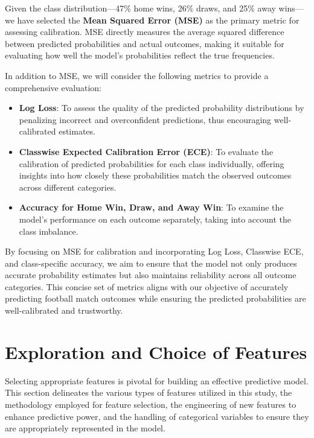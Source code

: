 Given the class distribution—47\% home wins, 26\% draws, and 25\% away wins—we have selected the \textbf{Mean Squared Error (MSE)} as the primary metric for assessing calibration. MSE directly measures the average squared difference between predicted probabilities and actual outcomes, making it suitable for evaluating how well the model's probabilities reflect the true frequencies.

In addition to MSE, we will consider the following metrics to provide a comprehensive evaluation:

\begin{itemize}
    \item \textbf{Log Loss}: To assess the quality of the predicted probability distributions by penalizing incorrect and overconfident predictions, thus encouraging well-calibrated estimates.
    \item \textbf{Classwise Expected Calibration Error (ECE)}: To evaluate the calibration of predicted probabilities for each class individually, offering insights into how closely these probabilities match the observed outcomes across different categories.
    \item \textbf{Accuracy for Home Win, Draw, and Away Win}: To examine the model's performance on each outcome separately, taking into account the class imbalance.
\end{itemize}

By focusing on MSE for calibration and incorporating Log Loss, Classwise ECE, and class-specific accuracy, we aim to ensure that the model not only produces accurate probability estimates but also maintains reliability across all outcome categories. This concise set of metrics aligns with our objective of accurately predicting football match outcomes while ensuring the predicted probabilities are well-calibrated and trustworthy.

\section{Exploration and Choice of Features}
\label{sec:feature_selection}

Selecting appropriate features is pivotal for building an effective predictive model. This section delineates the various types of features utilized in this study, the methodology employed for feature selection, the engineering of new features to enhance predictive power, and the handling of categorical variables to ensure they are appropriately represented in the model. 

